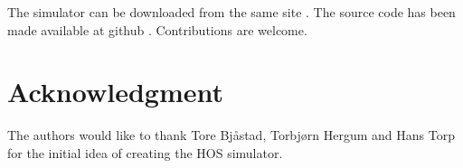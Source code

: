 %










The simulator can be downloaded from the same site \cite{hos}. The source code has been made available at github \cite{hosGit}. Contributions are welcome.

\section*{Acknowledgment}
The authors would like to thank Tore Bj\aa{}stad, Torbj\o{}rn Hergum and Hans Torp for the initial idea of creating the HOS simulator.


